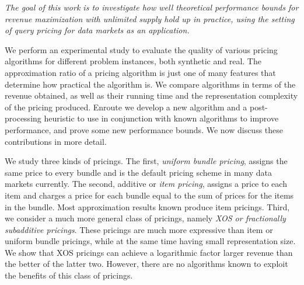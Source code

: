 
\vspace{1em}
\noindent
{\em The goal of this work is to investigate how well theoretical performance bounds for revenue maximization with unlimited supply hold up in practice, using the setting of query pricing for data markets as an application.} 
\vspace{1em}

We perform an experimental study to evaluate the quality of various pricing algorithms for different problem instances, both synthetic and real. The approximation ratio of a pricing algorithm is just one of many features that determine how practical the algorithm is. We compare algorithms in terms of the revenue obtained, as well as their running time and the representation complexity of the pricing produced. Enroute we develop a new algorithm and a post-processing heuristic to use in conjunction with known algorithms to improve performance, and prove some new performance bounds. We now discuss these contributions in more detail.

We study three kinds of pricings. The first, {\em uniform bundle pricing}, assigns the same price to every bundle and is the default pricing scheme in many data markets currently. The second, additive or {\em item pricing}, assigns a price to each item and charges a price for each bundle equal to the sum of prices for the items in the bundle. Most approximation results known produce item pricings. Third, we consider a much more general class of pricings, namely {\em XOS or fractionally subadditive pricings}. These pricings are much more expressive than item or uniform bundle pricings, while at the same time having small representation size. We show that XOS pricings can achieve a logarithmic factor larger revenue than the better of the latter two. However, there are no algorithms known to exploit the benefits of this class of pricings.

